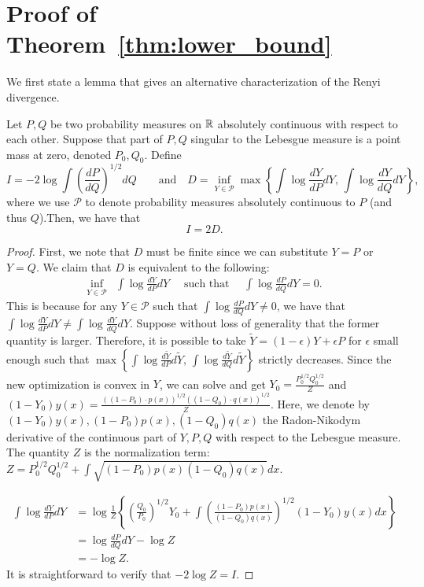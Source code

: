 \documentclass{article}
\begin{document}

\section{Proof of Theorem~\ref{thm:lower_bound}}
\label{sec:lower_bound_proof}

We first state a lemma that gives an alternative characterization of the Renyi divergence. 

\begin{lemma}
\label{lem:information_equivalence}

Let $P, Q$ be two probability measures on ${\mathbb R}$ absolutely continuous with respect to each other. Suppose that part of $P,Q$ singular to the Lebesgue measure is a point mass at zero, denoted $P_0, Q_0$. Define
\[
I = - 2 \log \int \left( \frac{dP}{dQ} \right)^{1/2} dQ \qquad  \text{and} \quad
D = \inf_{Y \in \mathcal{P}} \max \left\{ \int \log \frac{dY}{dP} dY, \, \int \log \frac{dY}{dQ} dY \right\},
\]
where we use $\mathcal{P}$ to denote probability measures absolutely continuous to $P$ (and thus $Q$).Then, we have that
\[ 
I = 2 D. 
\]
\end{lemma}


\begin{proof} 
First, we note that $D$ must be finite since we can substitute $Y = P$ or $Y= Q$. We claim that $D$ is equivalent to the following:
\begin{align*}
\inf_{Y \in \mathcal{P}} & \int \log \frac{dY}{dP} dY \quad \text{ such that } \quad \int \log \frac{dP}{dQ} dY = 0.
\end{align*}
This is because for any $Y \in \mathcal{P}$ such that $\int \log \frac{dP}{dQ} dY \neq 0$, 
we have that $\int \log \frac{dY}{dP} dY \neq \int \log \frac{dY}{dQ} dY$. 
Suppose without loss of generality that the former quantity is larger.  Therefore, it is possible to take $\tilde{Y} = (1 - \epsilon) Y + \epsilon P$ for $\epsilon$ small enough such that $ \max \left\{ \int \log \frac{d\tilde{Y}}{dP} d\tilde{Y}, \, \int \log \frac{d\tilde{Y}}{dQ} d\tilde{Y} \right\}$ strictly decreases. Since the new optimization is convex in $Y$, we can solve and get $Y_0 = \frac{P_0^{1/2} Q_0^{1/2}}{Z}$ and $(1-Y_0) y(x) = \frac{((1-P_0) \cdot p(x))^{1/2} ((1-Q_0) \cdot q(x))^{1/2}}{Z}$. Here, we denote by $(1-Y_0) y(x), (1-P_0)p(x), (1-Q_0)q(x)$ the Radon-Nikodym derivative of the continuous part of $Y, P, Q$ with respect to the Lebesgue measure. The quantity $Z$ is the normalization term: $Z = P_0^{1/2} Q_0^{1/2} + \int \sqrt{ (1-P_0) p(x) (1-Q_0) q(x)} dx$. 

\begin{align*}
\int \log \frac{dY}{dP} dY  &= \log \frac{1}{Z} \left\{ 
           \left( \frac{Q_0}{P_0} \right)^{1/2}  Y_0 + \int \left(\frac{(1-P_0) p(x)}{(1-Q_0)q(x)} \right)^{1/2} (1-Y_0) y(x) dx \right\} \\
  &= \log \frac{dP}{dQ} dY - \log Z \\
  &= - \log Z. 
\end{align*}
It is straightforward to verify that $-2 \log Z = I$. 
\end{proof}
\end{document}
